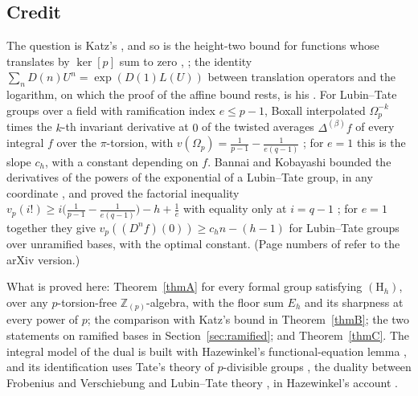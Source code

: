 \documentclass[11pt]{amsart}
\theoremstyle{definition}
\theoremstyle{remark}
\newcommand{\Z}{\mathbb Z}
\newcommand{\vp}{v_p}
\begin{document}
\subsection{Credit}
The question is Katz's \cite[\S I]{Katz77}, and so is the height-two bound for functions whose translates by $\ker[p]$ sum to zero \cite[Corollary 2]{Katz77}, \cite[Main Theorem 3.11]{Katz81}; the identity $\sum_nD(n)U^n=\exp(D(1)L(U))$ between translation operators and the logarithm, on which the proof of the affine bound rests, is his \cite[Corollary 1.8, p.~669]{Katz81}. For Lubin--Tate groups over a field with ramification index $e\le p-1$, Boxall interpolated $\Omega_p^{-k}$ times the $k$-th invariant derivative at $0$ of the twisted averages $\Delta^{(\beta)}f$ of every integral $f$ over the $\pi$-torsion, with $v(\Omega_p)=\frac1{p-1}-\frac1{e(q-1)}$ \cite[Theorem B, p.~3]{Boxall86}; for $e=1$ this is the slope $c_h$, with a constant depending on $f$. Bannai and Kobayashi bounded the derivatives of the powers of the exponential of a Lubin--Tate group, in any coordinate \cite[Proposition 3.5, p.~10]{BK16}, and proved the factorial inequality $\vp(i!)\ge i\bigl(\frac1{p-1}-\frac1{e(q-1)}\bigr)-h+\frac1e$ with equality only at $i=q-1$ \cite[Proposition 3.3, p.~8]{BK16}; for $e=1$ together they give $\vp((D^nf)(0))\ge c_hn-(h-1)$ for Lubin--Tate groups over unramified bases, with the optimal constant. (Page numbers of \cite{BK16} refer to the arXiv version.)

What is proved here: Theorem~\ref{thmA} for every formal group satisfying $(\mathrm H_h)$, over any $p$-torsion-free $\Z_{(p)}$-algebra, with the floor sum $E_h$ and its sharpness at every power of $p$; the comparison with Katz's bound in Theorem~\ref{thmB}; the two statements on ramified bases in Section~\ref{sec:ramified}; and Theorem~\ref{thmC}. The integral model of the dual is built with Hazewinkel's functional-equation lemma \cite[\S2]{Hazewinkel79}, and its identification uses Tate's theory of $p$-divisible groups \cite{Tate67}, the duality between Frobenius and Verschiebung \cite[Exp.~VII$_A$, 4.3]{SGA3} and Lubin--Tate theory \cite{LT65}, in Hazewinkel's account \cite[\S5]{Hazewinkel79}.
\end{document}
